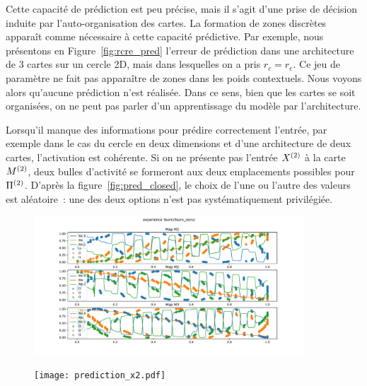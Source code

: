 \documentclass[../main]{subfiles}
\begin{document}
Cette capacité de prédiction est peu précise, mais il s'agit d'une prise de décision induite par l'auto-organisation des cartes.
La formation de zones discrètes apparaît comme nécessaire à cette capacité prédictive. Par exemple, nous présentons en Figure~\ref{fig:rcre_pred} l'erreur de prédiction dans une architecture de 3 cartes sur un cercle 2D, mais dans lesquelles on a pris $r_c = r_e$. Ce jeu de paramètre ne fait pas apparaître de zones dans les poids contextuels. Nous voyons alors qu'aucune prédiction n'est réalisée. Dans ce sens, bien que les cartes se soit organisées, on ne peut pas parler d'un apprentissage du modèle par l'architecture.

Lorsqu'il manque des informations pour prédire correctement l'entrée, par exemple dans le cas du cercle en deux dimensions et d'une architecture de deux cartes, l'activation est cohérente. Si on ne présente pas l'entrée $X^{({2})}$ à la carte $M^{({2})}$, deux bulles d'activité se formeront aux deux emplacements possibles pour $\Pi^{({2})}$. D'après la figure~\ref{fig:pred_closed}, le choix de l'une ou l'autre des valeurs est aléatoire~: une des deux options n'est pas systématiquement privilégiée.


\begin{figure}
	\centering\includegraphics[width=0.9\textwidth]{3som_cercle_w.pdf}
	\caption{\label{fig:w_cercle}}
\end{figure}

\begin{figure}
	\texttt{[image: prediction\_x2.pdf]}
	\caption{\label{fig:pred_cercle}}
\end{figure}
\end{document}
